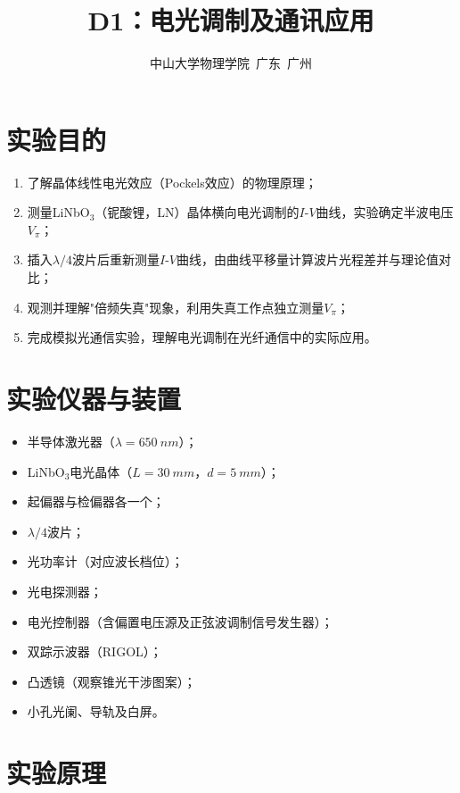 \documentclass[a4paper,8pt,twocolumn]{article}
\title{
  \textbf{\huge D1：电光调制及通讯应用}
}
\author{
  \small 中山大学物理学院~广东~广州
}
\begin{document}
\maketitle
\newpage

\section{实验目的}

\begin{enumerate}
  \item 了解晶体线性电光效应（Pockels效应）的物理原理；
  \item 测量LiNbO$_3$（铌酸锂，LN）晶体横向电光调制的$I$-$V$曲线，实验确定半波电压$V_\pi$；
  \item 插入$\lambda/4$波片后重新测量$I$-$V$曲线，由曲线平移量计算波片光程差并与理论值对比；
  \item 观测并理解"倍频失真"现象，利用失真工作点独立测量$V_\pi$；
  \item 完成模拟光通信实验，理解电光调制在光纤通信中的实际应用。
\end{enumerate}

\section{实验仪器与装置}

\begin{itemize}
  \item 半导体激光器（$\lambda=\SI{650}{nm}$）；
  \item LiNbO$_3$电光晶体（$L=\SI{30}{mm}$，$d=\SI{5}{mm}$）；
  \item 起偏器与检偏器各一个；
  \item $\lambda/4$波片；
  \item 光功率计（对应波长档位）；
  \item 光电探测器；
  \item 电光控制器（含偏置电压源及正弦波调制信号发生器）；
  \item 双踪示波器（RIGOL）；
  \item 凸透镜（观察锥光干涉图案）；
  \item 小孔光阑、导轨及白屏。
\end{itemize}

\section{实验原理}
\end{document}
